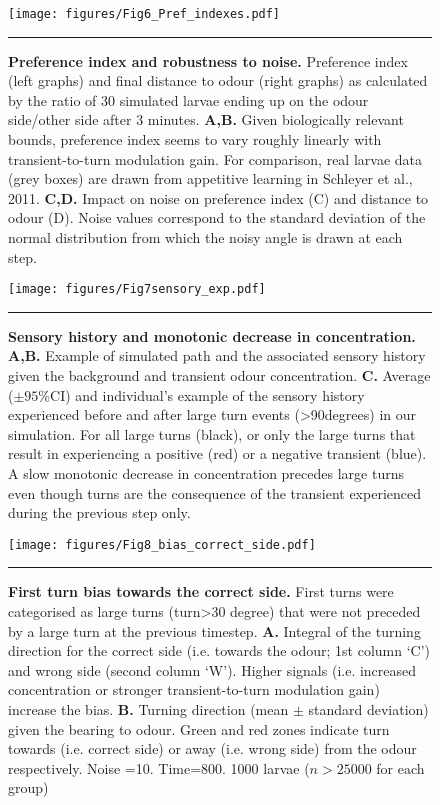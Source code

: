 \documentclass[10pt,a4paper]{article}
\begin{document}
\begin{figure}[!ht]
\begin{center}
\texttt{[image: figures/Fig6\_Pref\_indexes.pdf]}
\caption{{\bf Preference index and robustness to noise. }
Preference index (left graphs) and final distance to odour (right graphs) as calculated by the ratio of 30 simulated larvae ending up on the odour side/other side after 3 minutes.
{\bf A,B.} Given biologically relevant bounds, preference index seems to vary roughly linearly with transient-to-turn modulation gain. For comparison, real larvae data (grey boxes) are drawn from appetitive learning in Schleyer et al., 2011.
{\bf C,D.} Impact on noise on preference index (C) and distance to odour (D). Noise values correspond to the standard deviation of the normal distribution from which the noisy angle is drawn at each step.
\label{fig:Fig6}}
\hrule
\end{center}
\end{figure}

\begin{figure}[!ht]
\begin{center}
\texttt{[image: figures/Fig7sensory\_exp.pdf]}
\caption{{\bf Sensory history and monotonic decrease in concentration.} {\bf A,B.} Example of simulated path and the associated sensory history given the background and transient odour concentration.
{\bf  C.} Average ($\pm 95\%$CI) and individual’s example of the sensory history experienced before and after large turn events (>90degrees) in our simulation. For all large turns (black), or only the large turns that result in experiencing a positive (red) or a negative transient (blue). A slow monotonic decrease in concentration precedes large turns even though turns are the consequence of the transient experienced during the previous step only.
\label{fig:Fig7}}
\hrule
\end{center}
\end{figure}


\begin{figure}[!ht]
\begin{center}
\texttt{[image: figures/Fig8\_bias\_correct\_side.pdf]}
\caption{{\bf First turn bias towards the correct side.} First turns were categorised as large turns (turn>30 degree) that were not preceded by a large turn at the previous timestep.
{\bf A.} Integral of the turning direction for the correct side (i.e. towards the odour; 1st column ‘C’) and wrong side (second column ‘W’). Higher signals (i.e. increased concentration or stronger transient-to-turn modulation gain) increase the bias.
{\bf B.} Turning direction (mean $\pm$ standard deviation) given the bearing to odour. Green and red zones indicate turn towards (i.e. correct side) or away (i.e. wrong side) from the odour respectively. Noise =10. Time=800. 1000 larvae ($n > 25000$ for each group)
\label{fig:Fig8}}
\hrule
\end{center}
\end{figure}
\end{document}
